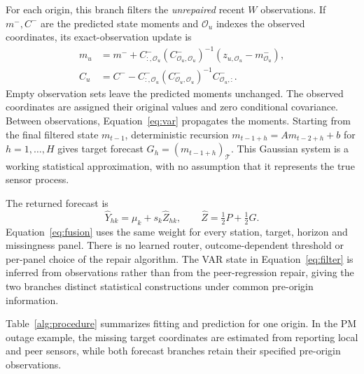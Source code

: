 For each origin, this branch filters the \emph{unrepaired} recent $W$ observations. If $m^-,C^-$ are the predicted state moments and $\mathcal O_u$ indexes the observed coordinates, its exact-observation update is
\begin{align}
 m_u&=m^-+C^-_{:,\mathcal O_u}(C^-_{\mathcal O_u,\mathcal O_u})^{-1}
          (z_{u,\mathcal O_u}-m^-_{\mathcal O_u}),\nonumber\\
 C_u&=C^- - C^-_{:,\mathcal O_u}(C^-_{\mathcal O_u,\mathcal O_u})^{-1}C^-_{\mathcal O_u,:}.
 \label{eq:filter}
\end{align}
Empty observation sets leave the predicted moments unchanged. The observed coordinates are assigned their original values and zero conditional covariance. Between observations, Equation~\ref{eq:var} propagates the moments. Starting from the final filtered state $m_{t-1}$, deterministic recursion $m_{t-1+h}=Am_{t-2+h}+b$ for $h=1,\ldots,H$ gives target forecast $G_h=(m_{t-1+h})_{\mathcal T}$. This Gaussian system is a working statistical approximation, with no assumption that it represents the true sensor process.

The returned forecast is
\begin{equation}
 \widehat Y_{hk}=\mu_k+s_k\widehat Z_{hk},\qquad
 \widehat Z=\tfrac12P+\tfrac12G.
 \label{eq:fusion}
\end{equation}
Equation~\ref{eq:fusion} uses the same weight for every station, target, horizon and missingness panel. There is no learned router, outcome-dependent threshold or per-panel choice of the repair algorithm. The VAR state in Equation~\ref{eq:filter} is inferred from observations rather than from the peer-regression repair, giving the two branches distinct statistical constructions under common pre-origin information.

Table~\ref{alg:procedure} summarizes fitting and prediction for one origin. In the PM outage example, the missing target coordinates are estimated from reporting local and peer sensors, while both forecast branches retain their specified pre-origin observations.


